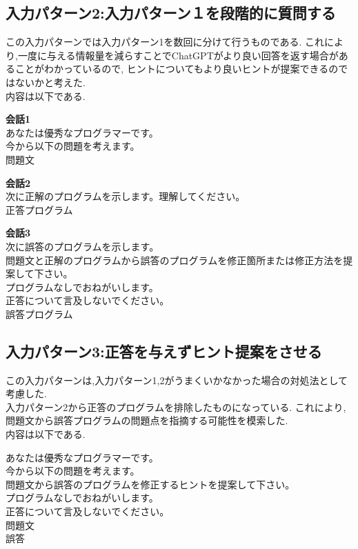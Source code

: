 \subsection{入力パターン2:入力パターン１を段階的に質問する}
この入力パターンでは入力パターン1を数回に分けて行うものである.
これにより,一度に与える情報量を減らすことでChatGPTがより良い回答を返す場合があることがわかっているので,
ヒントについてもより良いヒントが提案できるのではないかと考えた.\\
内容は以下である.
\begin{screen}
\textbf{会話1}\\
あなたは優秀なプログラマーです。\\
今から以下の問題を考えます。\\

問題文
\end{screen}

\begin{screen}
\textbf{会話2}\\
次に正解のプログラムを示します。理解してください。\\

正答プログラム 
\end{screen}

\begin{screen}
\textbf{会話3}\\
次に誤答のプログラムを示します。\\
問題文と正解のプログラムから誤答のプログラムを修正箇所または修正方法を提案して下さい。\\
プログラムなしでおねがいします。\\
正答について言及しないでください。\\
   
誤答プログラム
\end{screen}

\subsection{入力パターン3:正答を与えずヒント提案をさせる}
この入力パターンは,入力パターン1,2がうまくいかなかった場合の対処法として考慮した.\\
入力パターン2から正答のプログラムを排除したものになっている.
これにより,問題文から誤答プログラムの問題点を指摘する可能性を模索した.\\
内容は以下である.

\begin{screen}
あなたは優秀なプログラマーです。\\
今から以下の問題を考えます。\\
問題文から誤答のプログラムを修正するヒントを提案して下さい。\\
プログラムなしでおねがいします。\\
正答について言及しないでください。\\
    
問題文\\

誤答
\end{screen}